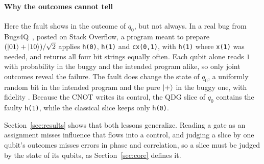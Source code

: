 \paragraph*{Why the outcomes cannot tell}
Here the fault shows in the outcome of $q_0$, but not always. In a real bug from Bugs4Q~\cite{zhao2023bugs4q}, posted
on Stack Overflow, a program meant to prepare $(\lvert 01\rangle+\lvert 10\rangle)/\sqrt{2}$ applies \texttt{h(0)}, \texttt{h(1)} and
\texttt{cx(0,1)}, with \texttt{h(1)} where \texttt{x(1)} was needed, and returns all four bit strings equally often.
Each qubit alone reads $1$ with probability \numMotPOne{} in the buggy and the intended program alike, so only joint
outcomes reveal the failure. The fault does change the state of $q_0$, a uniformly random bit in the intended program
and the pure $\lvert +\rangle$ in the buggy one, with fidelity \numMotFidelity{}. Because the CNOT writes its control, the QDG
slice of $q_0$ contains the faulty \texttt{h(1)}, while the classical slice keeps only \texttt{h(0)}.

Section~\ref{sec:results} shows that both lessons generalize. Reading a gate as an assignment misses influence that
flows into a control, and judging a slice by one qubit's outcomes misses errors in phase and correlation, so a slice
must be judged by the state of its qubits, as Section~\ref{sec:core} defines it.
